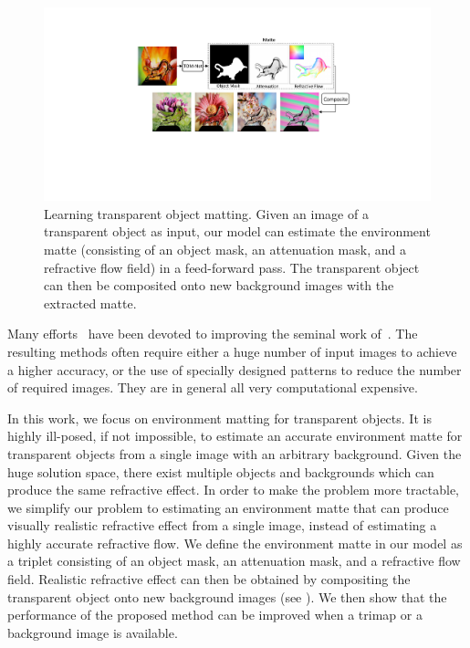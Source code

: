 \begin{figure}[t] \centering
    \includegraphics[width=\textwidth]{ch-tomnet/images/Method/Intro_network_intro_v3}
    \caption[Learning transparent object matting]{Learning transparent object matting. Given an image of a transparent object as input, our model can estimate the environment matte (consisting of an object mask, an attenuation mask, and a refractive flow field) in a feed-forward pass. The transparent object can then be composited onto new background images with the extracted matte.}
    \label{fig:intro}
\end{figure}

Many efforts~\cite{chuang2000environment,wexler2002image,peers2003wavelet,zhu2004frequency,duan2011flexible,duan2015compressive} have been devoted to improving the seminal work of~\cite{zongker1999environment}. The resulting methods often require either a huge number of input images to achieve a higher accuracy, or the use of specially designed patterns to reduce the number of required images. They are in general all very computational expensive.

In this work, we focus on environment matting for transparent objects. It is highly ill-posed, if not impossible, to estimate an accurate environment matte for transparent objects from a single image with an arbitrary background. Given the huge solution space, there exist multiple objects and backgrounds which can produce the same refractive effect. In order to make the problem more tractable, we simplify our problem to estimating an environment matte that can produce visually realistic refractive effect from a single image, instead of estimating a highly accurate refractive flow. We define the environment matte in our model as a triplet consisting of an object mask, an attenuation mask, and a refractive flow field. Realistic refractive effect can then be obtained by compositing the transparent object onto new background images (see ). We then show that the performance of the proposed method can be improved when a trimap or a background image is available.

